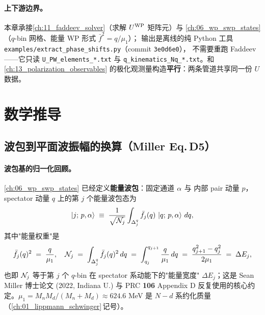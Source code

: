 \paragraph{上下游边界。}
本章承接\cref{ch:11_faddeev_solver}（求解 \(U^{\rm WP}\) 矩阵元）与
\cref{ch:06_wp_swp_states}（\(q\)-bin 网格、能量 WP 形式 \(\bar{f}^2 = q/\mu_1\)）；
输出是离线的纯 Python 工具
\texttt{examples/extract\_phase\_shifts.py}（commit \texttt{3e0d6e0}），
不需要重跑 Faddeev——它只读 \texttt{U\_PW\_elements\_*.txt} 与
\texttt{q\_kinematics\_Nq\_*.txt}。和\cref{ch:13_polarization_observables}
的极化观测量构造\textbf{平行}：两条管道共享同一份 \(U\) 数据。

\section{数学推导}
\label{sec:ch14-math}

\subsection{波包到平面波振幅的换算（Miller Eq.\,D5）}
\label{subsec:ch14-wp-to-plane}

\paragraph{波包基的归一化回顾。}
\cref{ch:06_wp_swp_states} 已经定义\textbf{能量波包}：固定通道 \(\alpha\) 与
内部 pair 动量 \(p\)，spectator 动量 \(q\) 上的第 \(j\) 个能量波包态为
\begin{equation}
\label{eq:ch14-energy-WP-def}
\ket{j;\, p, \alpha} \;\equiv\;
\frac{1}{\sqrt{\mathcal{N}_j}}
\int_{\Delta_{j}^{q}} \bar{f}_j(q)\, \ket{q;\, p, \alpha}\, dq,
\end{equation}
其中"能量权重"是
\begin{equation}
\label{eq:ch14-energy-weight}
\bar{f}_j(q)^2 \;=\; \frac{q}{\mu_1},
\quad
\mathcal{N}_j \;=\; \int_{\Delta_{j}^{q}} \bar{f}_j(q)^2\, dq
\;=\; \int_{q_j}^{q_{j+1}} \frac{q}{\mu_1}\, dq
\;=\; \frac{q_{j+1}^2 - q_j^2}{2\mu_1}
\;=\; \Delta E_j,
\end{equation}
也即 \(\mathcal{N}_j\) 等于第 \(j\) 个 \(q\)-bin 在 spectator 系动能下的"能量宽度"
\(\Delta E_j\)；这是 Sean Miller 博士论文 (2022, Indiana U.) 与
PRC \textbf{106} Appendix D 反复使用的核心约定。\(\mu_1 = M_n M_d /
(M_n + M_d) \approx 624.6\) MeV 是 \(N\!-\!d\) 系约化质量
（\cref{ch:01_lippmann_schwinger}\(\,\)记号）。


